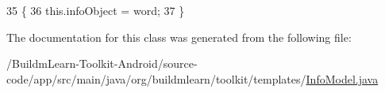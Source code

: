 \begin{DoxyCode}
35                                      \{
36         this.infoObject = word;
37     \}
\end{DoxyCode}


The documentation for this class was generated from the following file\-:\begin{DoxyCompactItemize}
\item 
/\-Buildm\-Learn-\/\-Toolkit-\/\-Android/source-\/code/app/src/main/java/org/buildmlearn/toolkit/templates/\hyperlink{templates_2InfoModel_8java}{Info\-Model.\-java}\end{DoxyCompactItemize}
